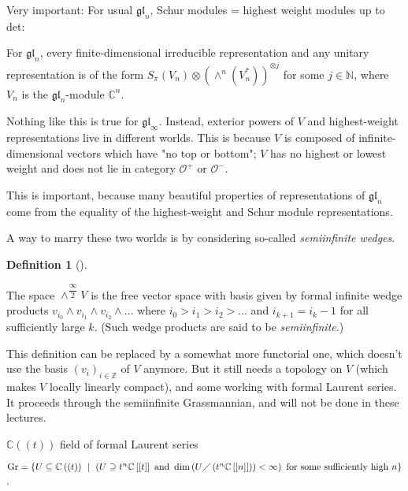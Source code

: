 \documentclass
[numbers=enddot,12pt,final,onecolumn,german,notitlepage]{scrartcl}%
\theoremstyle{definition}
\newtheorem{defi}[theo]{Definition}
\newenvironment{definition}[1][]
{\begin{defi}[#1]\begin{leftbar}}
{\end{leftbar}\end{defi}}
\begin{document}
Very important: For usual $\mathfrak{gl}_{n}$, Schur modules = highest weight
modules up to det:

For $\mathfrak{gl}_{n}$, every finite-dimensional irreducible representation
and any unitary representation is of the form $S_{\pi}\left(  V_{n}\right)
\otimes\left(  \wedge^{n}\left(  V_{n}^{\ast}\right)  \right)  ^{\otimes j}$
for some $j\in\mathbb{N}$, where $V_{n}$ is the $\mathfrak{gl}_{n}$-module
$\mathbb{C}^{n}$.

Nothing like this is true for $\mathfrak{gl}_{\infty}$. Instead, exterior
powers of $V$ and highest-weight representations live in different worlds.
This is because $V$ is composed of infinite-dimensional vectors which have "no
top or bottom"; $V$ has no highest or lowest weight and does not lie in
category $\mathcal{O}^{+}$ or $\mathcal{O}^{-}$.

This is important, because many beautiful properties of representations of
$\mathfrak{gl}_{n}$ come from the equality of the highest-weight and Schur
module representations.

A way to marry these two worlds is by considering so-called
\textit{semiinfinite wedges}.

\begin{definition}
The space $\wedge^{\dfrac{\infty}{2}}V$ is the free vector space with basis
given by formal infinite wedge products $v_{i_{0}}\wedge v_{i_{1}}\wedge
v_{i_{2}}\wedge...$ where $i_{0}>i_{1}>i_{2}>...$ and $i_{k+1}=i_{k}-1$ for
all sufficiently large $k$. (Such wedge products are said to be
\textit{semiinfinite}.)
\end{definition}

This definition can be replaced by a somewhat more functorial one, which
doesn't use the basis $\left(  v_{i}\right)  _{i\in\mathbb{Z}}$ of $V$
anymore. But it still needs a topology on $V$ (which makes $V$ locally
linearly compact), and some working with formal Laurent series. It proceeds
through the semiinfinite Grassmannian, and will not be done in these lectures.

$\mathbb{C}\left(  \left(  t\right)  \right)  $ field of formal Laurent series

$\operatorname*{Gr}=\left\{  U\subseteq\mathbb{C}\left(  \left(  t\right)
\right)  \ \mid\ \left(  U\supseteq t^{n}\mathbb{C}\left[  \left[  t\right]
\right]  \text{ and }\dim\left(  U\diagup\left(  t^{n}\mathbb{C}\left[
\left[  n\right]  \right]  \right)  \right)  <\infty\right)  \text{ for some
sufficiently high }n\right\}  $.
\end{document}
